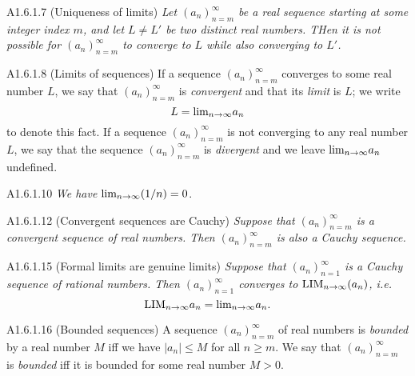 \begin{proposition}{A1.6.1.7}
    (Uniqueness of limits) \emph{Let $(a_n)_{n=m}^{\infty}$ be a real sequence
    starting at some integer index $m$, and let $L \neq L'$ be two distinct real
    numbers. THen it is not possible for $(a_n)_{n=m}^{\infty}$ to converge to $L$
    while also converging to $L'$.}
\end{proposition}

\begin{definition}{A1.6.1.8}
    (Limits of sequences) If a sequence $(a_n)_{n=m}^{\infty}$ converges to some
    real number $L$, we say that $(a_n)_{n=m}^{\infty}$ is \emph{convergent} and
    that its \emph{limit} is $L$; we write
    \begin{equation*}
        L = \text{lim}_{n \rightarrow \infty}{a_n}
    \end{equation*}
    to denote this fact. If a sequence $(a_n)_{n=m}^{\infty}$ is not converging
    to any real number $L$, we say that the sequence $(a_n)_{n=m}^{\infty}$ is
    \emph{divergent} and we leave $\text{lim}_{n \rightarrow \infty}{a_n}$ undefined.
\end{definition}

\begin{proposition}{A1.6.1.10}
    \emph{We have $\text{lim}_{n \rightarrow \infty}{(}1/n) = 0$}.
\end{proposition}

\begin{proposition}{A1.6.1.12}
    (Convergent sequences are Cauchy) \emph{Suppose that $(a_n)_{n=m}^{\infty}$
    is a convergent sequence of real numbers. Then $(a_n)_{n=m}^{\infty}$ is also
    a Cauchy sequence.}
\end{proposition}

\begin{proposition}{A1.6.1.15}
    (Formal limits are genuine limits) \emph{Suppose that $(a_n)_{n=1}^{\infty}$
    is a Cauchy sequence
    of rational numbers. Then $(a_n)_{n=1}^{\infty}$ converges
    to $\text{LIM}_{n \rightarrow \infty}{(}a_n)$, i.e.
    \begin{equation*}
        \text{LIM}_{n \rightarrow \infty}{a_n} = \text{lim}_{n \rightarrow \infty}{a_n}.
    \end{equation*}
    }
\end{proposition}

\begin{definition}{A1.6.1.16}
    (Bounded sequences) A sequence $(a_n)_{n=m}^{\infty}$ of real numbers is
    \emph{bounded} by a real number $M$ iff we have $|a_n| \leq M$
    for all $n \geq m$. We say that $(a_n)_{n=m}^{\infty}$ is \emph{bounded} iff
    it is bounded for some real number $M > 0$.
\end{definition}

